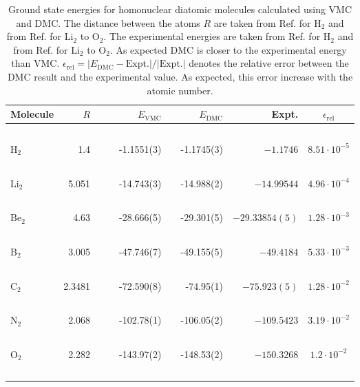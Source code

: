 \begin{table}
\begin{center}
\begin{tabular}{lrccrlrrc}
Molecule & $R$ & & \qquad & $E_\mathrm{VMC}$ & & \qquad $E_\mathrm{DMC}$ & \qquad\,\, Expt. & \qquad $\epsilon_\mathrm{rel}$\\
\hline\hline
\ \\
$\mathrm{H_2}$ & 1.4   & &\qquad & -1.1551(3)    & \qquad   & -1.1745(3)   & \qquad $-1.1746$      & \qquad $8.51\cdot 10^{-5}$ \\
\ \\
$\mathrm{Li_2}$& 5.051 & &\qquad & -14.743(3)    & \qquad   & -14.988(2)   & \qquad $-14.99544$    & \qquad $4.96\cdot 10^{-4}$ \\
\ \\
$\mathrm{Be_2}$& 4.63  & &\qquad & -28.666(5)    & \qquad   & -29.301(5)   & \qquad $-29.33854(5)$ & \qquad $1.28\cdot 10^{-3}$  \\
\ \\
$\mathrm{B_2}$ & 3.005 & &\qquad & -47.746(7)    & \qquad   & -49.155(5)   & \qquad $-49.4184$     & \qquad $5.33\cdot 10^{-3}$  \\
\ \\
$\mathrm{C_2}$ & 2.3481& &\qquad & -72.590(8)    & \qquad   & -74.95(1)    & \qquad $-75.923(5)$   & \qquad $1.28\cdot 10^{-2}$  \\
\ \\
$\mathrm{N_2}$ & 2.068 & &\qquad & -102.78(1)    & \qquad   & -106.05(2)   & \qquad $-109.5423$    & \qquad $3.19\cdot 10^{-2}$  \\
\ \\
$\mathrm{O_2}$ & 2.282 & &\qquad & -143.97(2)    & \qquad   & -148.53(2)   & \qquad $-150.3268$    & \qquad $1.2\cdot 10^{-2}$  \\
\ \\
\end{tabular}
\caption{Ground state energies for homonuclear diatomic molecules calculated using VMC and DMC. The distance between the atoms $R$ are taken from Ref. \cite{H_He_exact} for $\mathrm{H_2}$ and from Ref. \cite{UmrigarMolecules} for $\mathrm{Li_2}$ to $\mathrm{O_2}$. The experimental energies are taken from Ref. \cite{H_He_exact} for $\mathrm{H_2}$ and from Ref. \cite{ExactMolecules} for $\mathrm{Li_2}$ to $\mathrm{O_2}$. As expected DMC is closer to the experimental energy than VMC. $\epsilon_\mathrm{rel} = |E_\mathrm{DMC} - \mathrm{Expt.}|/|\mathrm{Expt.}|$ denotes the relative error between the DMC result and the experimental value. As expected, this error increase with the atomic number.}
\label{tab:MoleculesRes}
\end{center}
\end{table}

